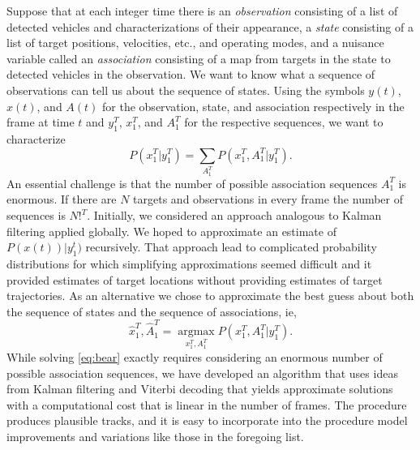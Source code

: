 \documentclass[]{article}
\newcommand{\ti}[2]{{#1}{(#2)}}                         %
\newcommand{\ts}[3]{{#1}_{#2}^{#3}} %
\newcommand{\argmax}{\operatorname*{argmax}}
\begin{document}
Suppose that at each integer time there is an \emph{observation}
consisting of a list of detected vehicles and characterizations of
their appearance, a \emph{state} consisting of a list of target
positions, velocities, etc., and operating modes, and a nuisance
variable called an \emph{association} consisting of a map from targets
in the state to detected vehicles in the observation.  We want to know
what a sequence of observations can tell us about the sequence of
states.  Using the symbols $\ti{y}{t}$, $\ti{x}{t}$, and $\ti{A}{t}$
for the observation, state, and association respectively in the frame
at time $t$ and $\ts{y}{1}{T}$, $\ts{x}{1}{T}$, and $\ts{A}{1}{T}$ for
the respective sequences, we want to characterize
\begin{equation*}
  P(\ts{x}{1}{T}|\ts{y}{1}{T}) = \sum_{\ts{A}{1}{T}}  P(\ts{x}{1}{T},
  \ts{A}{1}{T}|\ts{y}{1}{T}).
\end{equation*}
An essential challenge is that the number of possible association
sequences $\ts{A}{1}{T}$ is enormous.  If there are $N$ targets and
observations in every frame the number of sequences is $N!^T$.
Initially, we considered an approach analogous to Kalman filtering
applied globally.  We hoped to approximate an estimate of
$P(\ti{x}{t})|\ts{y}{1}{t})$ recursively.  That approach lead to
complicated probability distributions for which simplifying
approximations seemed difficult and it provided estimates of target
locations without providing estimates of target trajectories.  As an
alternative we chose to approximate the best guess about both the
sequence of states and the sequence of associations, ie,
\begin{equation}
  \label{eq:bear}
  \ts{{\hat x}}{1}{T},\ts{{\hat A}}{1}{T} =
  \argmax_{\ts{x}{1}{T},\ts{A}{1}{T}}   P(\ts{x}{1}{T},
  \ts{A}{1}{T}|\ts{y}{1}{T}).
\end{equation}
While solving \eqref{eq:bear} exactly requires considering an enormous
number of possible association sequences, we have developed an
algorithm that uses ideas from Kalman filtering and Viterbi decoding
that yields approximate solutions with a computational cost that is
linear in the number of frames.  The procedure produces plausible
tracks, and it is easy to incorporate into the procedure model
improvements and variations like those in the foregoing list.

\end{document}
